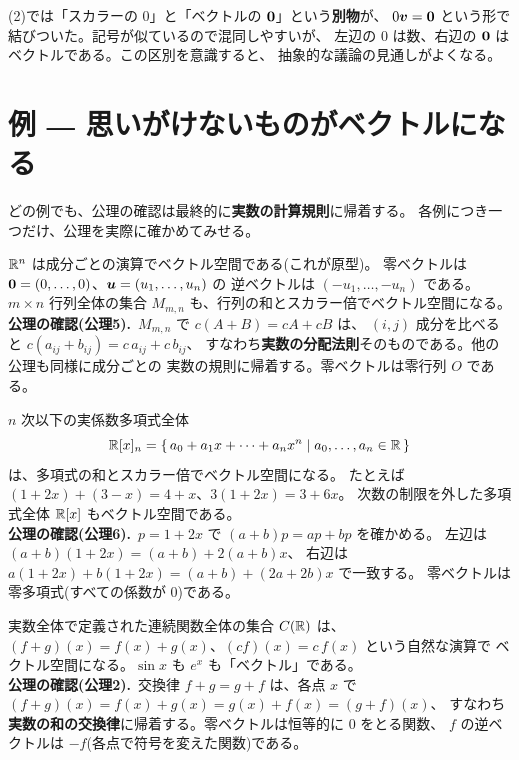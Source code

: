 \begin{chui}
(2)では「スカラーの $0$」と「ベクトルの $\bm{0}$」という\textbf{別物}が、
$0\bm{v} = \bm{0}$ という形で結びついた。記号が似ているので混同しやすいが、
左辺の $0$ は数、右辺の $\bm{0}$ はベクトルである。この区別を意識すると、
抽象的な議論の見通しがよくなる。
\end{chui}

\section{例 ― 思いがけないものがベクトルになる}

どの例でも、公理の確認は最終的に\textbf{実数の計算規則}に帰着する。
各例につき一つだけ、公理を実際に確かめてみせる。

\begin{rei}[数ベクトル空間と行列の空間]
$\mathbb{R}^n$ は成分ごとの演算でベクトル空間である(これが原型)。
零ベクトルは $\bm{0} = (0, \dots, 0)$、$\bm{u} = (u_1, \dots, u_n)$ の
逆ベクトルは $(-u_1, \dots, -u_n)$ である。
$m \times n$ 行列全体の集合 $M_{m,n}$ も、行列の和とスカラー倍でベクトル空間になる。\\
\textbf{公理の確認(公理5).}\ $M_{m,n}$ で $c(A + B) = cA + cB$ は、
$(i,j)$ 成分を比べると $c(a_{ij} + b_{ij}) = c\,a_{ij} + c\,b_{ij}$、
すなわち\textbf{実数の分配法則}そのものである。他の公理も同様に成分ごとの
実数の規則に帰着する。零ベクトルは零行列 $O$ である。
\end{rei}

\begin{rei}[多項式の空間]
$n$ 次以下の実係数多項式全体
\[
\mathbb{R}[x]_n = \{\, a_0 + a_1 x + \cdots + a_n x^n \mid a_0, \dots, a_n \in \mathbb{R} \,\}
\]
は、多項式の和とスカラー倍でベクトル空間になる。
たとえば $(1 + 2x) + (3 - x) = 4 + x$、$3(1 + 2x) = 3 + 6x$。
次数の制限を外した多項式全体 $\mathbb{R}[x]$ もベクトル空間である。\\
\textbf{公理の確認(公理6).}\ $p = 1 + 2x$ で $(a + b)p = ap + bp$ を確かめる。
左辺は $(a + b)(1 + 2x) = (a + b) + 2(a + b)x$、
右辺は $a(1 + 2x) + b(1 + 2x) = (a + b) + (2a + 2b)x$ で一致する。
零ベクトルは零多項式(すべての係数が $0$)である。
\end{rei}

\begin{rei}[関数の空間]
実数全体で定義された連続関数全体の集合 $C(\mathbb{R})$ は、
$(f + g)(x) = f(x) + g(x)$、$(cf)(x) = c\,f(x)$ という自然な演算で
ベクトル空間になる。$\sin x$ も $e^x$ も「ベクトル」である。\\
\textbf{公理の確認(公理2).}\ 交換律 $f + g = g + f$ は、各点 $x$ で
$(f + g)(x) = f(x) + g(x) = g(x) + f(x) = (g + f)(x)$、
すなわち\textbf{実数の和の交換律}に帰着する。零ベクトルは恒等的に $0$ をとる関数、
$f$ の逆ベクトルは $-f$(各点で符号を変えた関数)である。
\end{rei}

